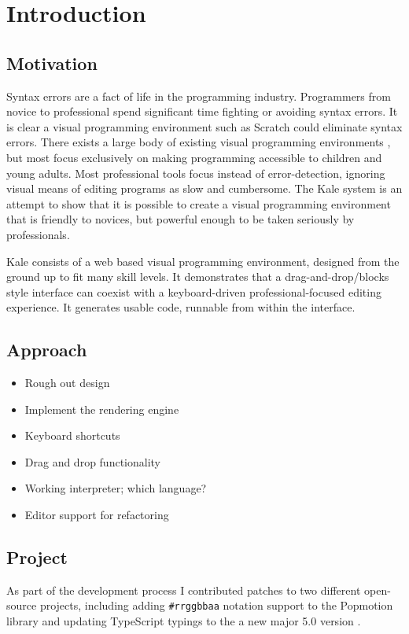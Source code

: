 \chapter{Introduction}

\section{Motivation}
Syntax errors are a fact of life in the programming industry. Programmers from
novice \citep{Denny2011} to professional spend significant time fighting or
avoiding syntax errors. It is clear a visual programming environment such
as Scratch could eliminate syntax errors. There exists a large body of existing
visual programming environments \citep{Beldie1983}, but most focus exclusively
on making programming accessible to children and young adults. Most
professional tools focus instead of error-detection, ignoring visual means of
editing programs as slow and cumbersome. The Kale system is an attempt to show that it is possible to create a
visual programming environment that is friendly to novices, but powerful enough to be
taken seriously by professionals. 

Kale consists of a web based visual programming environment, designed
from the ground up to fit many skill levels. It demonstrates that a
drag-and-drop/blocks style interface can coexist with a keyboard-driven
professional-focused editing experience. It generates usable code,
runnable from within the interface.

\section{Approach}

\begin{itemize}
	\item Rough out design
	\item Implement the rendering engine
	\item Keyboard shortcuts
	\item Drag and drop functionality
	\item Working interpreter; which language?
	\item Editor support for refactoring
\end{itemize}

\section{Project}

As part of the development process I contributed patches to two different
open-source projects, including adding \texttt{\#rrggbbaa} notation support
to the Popmotion library \citep{github-pr-popmotion} and updating
 TypeScript typings to the a new major 5.0
version \citep{github-pr-styled-components}.

